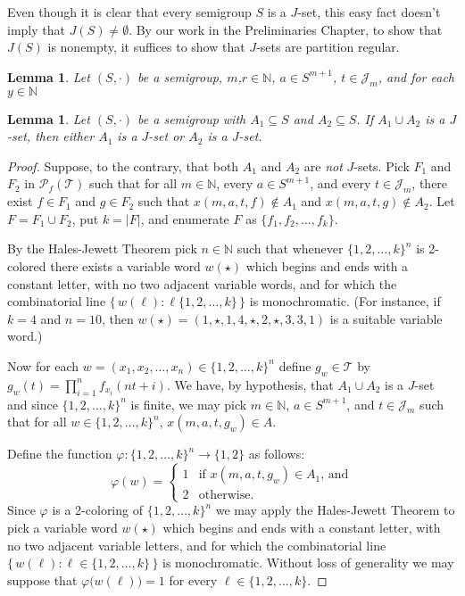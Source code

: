 \documentclass[12pt]{article}
\theoremstyle{plain}
\newtheorem{lem}[thm]{Lemma}
\theoremstyle{definition}
\newcommand{\bbN}{\mathbb{N}}
\newcommand{\calJ}{\mathcal{J}}
\newcommand{\calT}{\mathcal{T}}
\newcommand{\Pf}{\mathcal{P}_f}
\begin{document}
Even though it is clear that every semigroup $S$ is a $J$-set, this easy fact doesn't imply that $J(S) \ne \emptyset$. 
By our work in the Preliminaries Chapter, to show that $J(S)$ is nonempty, it suffices to show that $J$-sets are partition regular.

\begin{lem}
  Let $(S, \cdot)$ be a semigroup, $m$,$r \in \bbN$, $a \in S^{m+1}$, $t \in \calJ_m$, and for each $y \in \bbN$ 

\end{lem}

\begin{lem}
  Let $(S, \cdot)$ be a semigroup with $A_1 \subseteq S$ and $A_2 \subseteq S$.
  If $A_1 \cup A_2$ is a $J$-set, then either $A_1$ is a $J$-set or $A_2$ is a $J$-set.
\end{lem}
\begin{proof}
  Suppose, to the contrary, that both $A_1$ and $A_2$ are \textsl{not} $J$-sets.
  Pick $F_1$ and $F_2$ in $\Pf(\calT)$ such that for all $m \in \bbN$, every $a \in S^{m+1}$, and every $t \in \calJ_m$, there exist $f \in F_1$ and $g \in F_2$ such that $x(m, a, t, f) \not\in A_1$ and $x(m, a, t, g) \not\in A_2$.
  Let $F = F_1 \cup F_2$, put $k = |F|$, and enumerate $F$ as $\{f_1, f_2, \ldots, f_k\}$.

  By the Hales-Jewett Theorem pick $n \in \bbN$ such that whenever $\{1, 2, \ldots, k\}^n$ is 2-colored there exists a variable word $w(\star)$ which begins and ends with a constant letter, with no two adjacent variable words, and for which the combinatorial line $\bigl\{\, w(\ell) : \ell \{1, 2, \ldots, k\} \,\bigr\}$ is monochromatic. 
  (For instance, if $k = 4$ and $n = 10$, then $w(\star) = (1, \star, 1, 4, \star, 2, \star, 3, 3, 1)$ is a suitable variable word.)

  Now for each $w = (x_1, x_2, \ldots, x_n) \in \{1, 2, \ldots, k\}^n$ define $g_w \in \calT$ by $g_w(t) = \prod_{i=1}^n f_{x_i}(nt + i)$.
  We have, by hypothesis, that $A_1 \cup A_2$ is a $J$-set and since $\{1, 2, \ldots, k\}^n$ is finite, we may pick $m \in \bbN$, $a \in S^{m+1}$, and $t \in \calJ_m$ such that for all $w \in \{1, 2, \ldots, k\}^n$, $x(m, a, t, g_w) \in A$.

  Define the function $\varphi \colon \{1, 2, \ldots, k\}^n \to \{1, 2\}$ as follows:
  \[
    \varphi(w) = 
    \begin{cases}
      1 & \mbox{if $x(m, a, t, g_w) \in A_1$, and} \\
      2 & \mbox{otherwise.}
    \end{cases}
  \]
  Since $\varphi$ is a 2-coloring of $\{1, 2, \ldots, k\}^n$ we may apply the Hales-Jewett Theorem to pick a variable word $w(\star)$ which begins and ends with a constant letter, with no two adjacent variable letters, and for which the combinatorial line $\bigl\{\, w(\ell) : \ell \in \{1, 2, \ldots, k\} \,\bigr\}$ is monochromatic. 
  Without loss of generality we may suppose that $\varphi \bigl( w(\ell) \bigr) = 1$ for every $\ell \in \{1, 2, \ldots, k\}$.


\end{proof}
\end{document}
